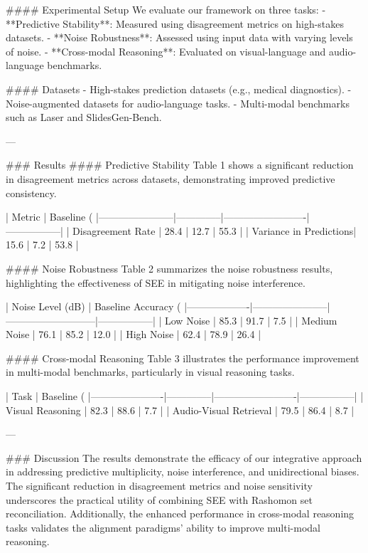 #### Experimental Setup
We evaluate our framework on three tasks:
- **Predictive Stability**: Measured using disagreement metrics on high-stakes datasets.
- **Noise Robustness**: Assessed using input data with varying levels of noise.
- **Cross-modal Reasoning**: Evaluated on visual-language and audio-language benchmarks.

#### Datasets
- High-stakes prediction datasets (e.g., medical diagnostics).
- Noise-augmented datasets for audio-language tasks.
- Multi-modal benchmarks such as Laser and SlidesGen-Bench.

---

### Results
#### Predictive Stability
Table 1 shows a significant reduction in disagreement metrics across datasets, demonstrating improved predictive consistency.

| Metric                | Baseline (%
|-----------------------|--------------|-------------------------|-----------------|
| Disagreement Rate     | 28.4         | 12.7                    | 55.3            |
| Variance in Predictions| 15.6         | 7.2                     | 53.8            |

#### Noise Robustness
Table 2 summarizes the noise robustness results, highlighting the effectiveness of SEE in mitigating noise interference.

| Noise Level (dB) | Baseline Accuracy (%
|-------------------|-----------------------|---------------------------|-----------------|
| Low Noise         | 85.3                 | 91.7                      | 7.5             |
| Medium Noise      | 76.1                 | 85.2                      | 12.0            |
| High Noise        | 62.4                 | 78.9                      | 26.4            |

#### Cross-modal Reasoning
Table 3 illustrates the performance improvement in multi-modal benchmarks, particularly in visual reasoning tasks.

| Task                 | Baseline (%
|----------------------|--------------|-------------------------|-----------------|
| Visual Reasoning     | 82.3         | 88.6                    | 7.7             |
| Audio-Visual Retrieval | 79.5         | 86.4                    | 8.7             |

---

### Discussion
The results demonstrate the efficacy of our integrative approach in addressing predictive multiplicity, noise interference, and unidirectional biases. The significant reduction in disagreement metrics and noise sensitivity underscores the practical utility of combining SEE with Rashomon set reconciliation. Additionally, the enhanced performance in cross-modal reasoning tasks validates the alignment paradigms' ability to improve multi-modal reasoning.

